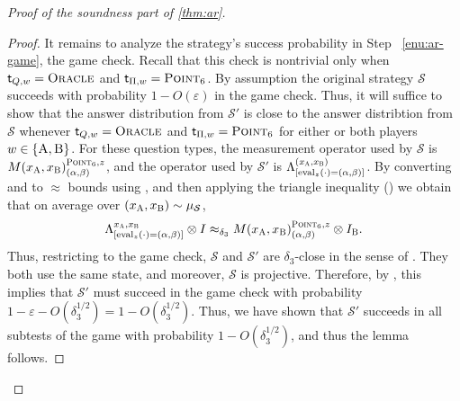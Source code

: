 \documentclass[11pt]{article}
\theoremstyle{definition}
\newcommand{\ot}{\otimes}
\newcommand{\eps}{\varepsilon}
\newcommand{\sampler}{\mathcal{S}}
\newcommand{\strategy}{\mathscr{S}}
\newcommand{\labelstyle}[1]{\ensuremath{\textsc{#1}}\xspace}
\newcommand{\tvarstyle}[1]{\mathsf{#1}}
\newcommand{\tvar}{\ensuremath{\tvarstyle{t}}}
\newcommand{\alice}{\labelstyle{A}}
\newcommand{\bob}{\labelstyle{B}}
\newcommand{\oracle}{\labelstyle{Oracle}}
\newcommand{\typestyle}[1]{\ensuremath{\textsc{#1}}\xspace}
\newcommand{\Point}{\typestyle{Point}}
\newcommand{\eval}{\mathrm{eval}}
\begin{document}
\begin{proof}[Proof of the soundness part of \cref{thm:ar}]
\begin{proof}
  It remains to analyze the strategy's success probability
  in Step ~\ref{enu:ar-game}, the game check. Recall that this check
  is nontrivial only when $\tvar_{Q,w} = \oracle$ and $\tvar_{\Pi,w} =
  \Point_6$. By assumption the original strategy $\strategy$ succeeds with
  probability $1-O(\eps)$ in the game check. Thus, it will suffice to
  show that the answer distribution from $\strategy'$ is close to the
  answer distribtion from $\strategy$ whenever $\tvar_{Q,w} = \oracle$
  and $\tvar_{\Pi,w} = \Point_6$ for either or both players $w \in
  \{\alice, \bob\}$. For these question types, the measurement
  operator used by $\strategy$ is $M(x_\alice, x_\bob)^{\Point_6,
    z}_{(\alpha, \beta)}$, and
  the operator used by $\strategy'$ is $\Lambda^{(x_\alice,
    x_\bob)}_{[\eval_z(\cdot) = (\alpha, \beta)]}$. By converting
   and  to
  $\approx$ bounds using , and then applying the
  triangle inequality () we obtain
  that on average over $(x_\alice, x_\bob) \sim \mu_\sampler$,
  \[ \Lambda^{x_\alice, x_\bob}_{[\eval_{z}(\cdot) = (\alpha, \beta)]}
    \ot I \approx_{\delta_3} M(x_\alice,
    x_\bob)^{\Point_6, z}_{(\alpha, \beta)} \ot I_{\bob}. \]
  Thus, restricting to the game check, $\strategy$ and $\strategy'$
  are $\delta_3$-close in the sense of
  . They both use the same state, and
  moreover, $\strategy$ is projective. Therefore, by , this implies that $\strategy'$ must
  succeed in the game check with probability $1 - \eps -
  O(\delta_3^{1/2}) = 1 - O(\delta_3^{1/2})$.  
  Thus, we have shown that $\strategy'$ succeeds in all subtests of the
  game with probability $1 - O(\delta_3^{1/2})$, and thus the lemma follows.
\end{proof}


\end{proof}
\end{document}
